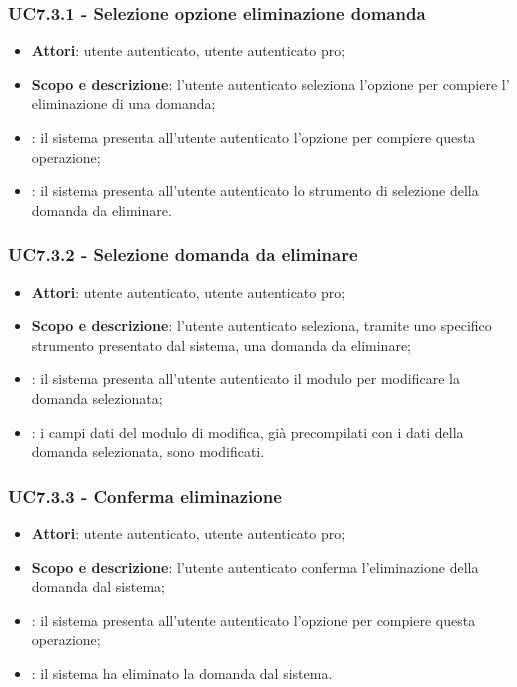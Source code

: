 	\subsubsection{UC7.3.1 - Selezione opzione eliminazione domanda}
	\begin{itemize}
		\item
			\textbf{Attori}: utente autenticato, utente autenticato pro;
		\item
			\textbf{Scopo e descrizione}: l'utente autenticato seleziona l'opzione per compiere l' eliminazione di una domanda;
		\item		
			: il sistema presenta all'utente autenticato l'opzione per compiere questa operazione;
		\item
			: il sistema presenta all'utente autenticato lo strumento di selezione della domanda da eliminare.
	\end{itemize}
	\subsubsection{UC7.3.2 - Selezione domanda da eliminare}
	\begin{itemize}
		\item
			\textbf{Attori}: utente autenticato, utente autenticato pro;
		\item
			\textbf{Scopo e descrizione}: l'utente autenticato seleziona, tramite uno specifico strumento presentato dal sistema, una domanda da eliminare;
		\item		
			: il sistema presenta all'utente autenticato il modulo per modificare la domanda selezionata;
		\item
			: i campi dati del modulo di modifica, già precompilati con i dati della domanda selezionata, sono modificati.
	\end{itemize}		
	\subsubsection{UC7.3.3 - Conferma eliminazione}
	\begin{itemize}
		\item
			\textbf{Attori}: utente autenticato, utente autenticato pro;
		\item
			\textbf{Scopo e descrizione}: l'utente autenticato conferma l'eliminazione della domanda dal sistema;
		\item		
			: il sistema presenta all'utente autenticato l'opzione per compiere questa operazione;
		\item
			: il sistema ha eliminato la domanda dal sistema.
	\end{itemize}	